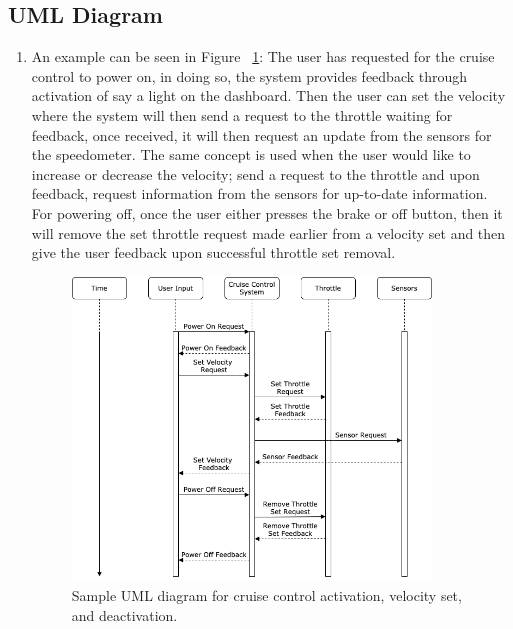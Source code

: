 \documentclass[preprint,11pt,3p]{article}
\begin{document}
\subsection{UML Diagram}
\begin{enumerate}
	\item An example can be seen in Figure ~\ref{fig:ccUML1}: The user has requested for the cruise control to power on, in doing so, the system provides feedback through activation of say a light on the dashboard. Then the user can set the velocity where the system will then send a request to the throttle waiting for feedback, once received, it will then request an update from the sensors for the speedometer. The same concept is used when the user would like to increase or decrease the velocity; send a request to the throttle and upon feedback, request information from the sensors for up-to-date information. For powering off, once the user either presses the brake or off button, then it will remove the set throttle request made earlier from a velocity set and then give the user feedback upon successful throttle set removal. %
		\begin{figure}[h]
			\includegraphics[width=0.9\textwidth]{images/ccUML.png}
			\caption{Sample UML diagram for cruise control activation, velocity set, and deactivation.}
			\label{fig:ccUML1}
		\end{figure}
\end{enumerate}


	
\end{document}
